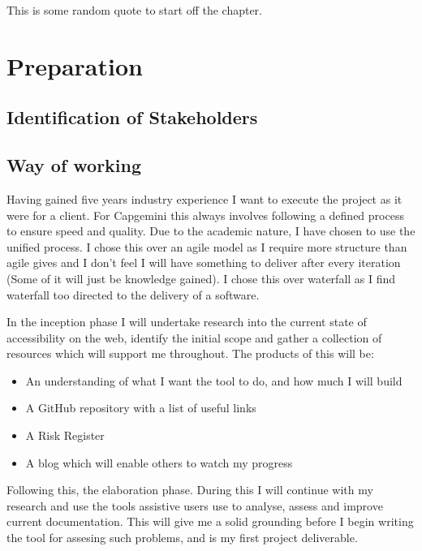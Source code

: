 \begin{savequote}[75mm]
This is some random quote to start off the chapter.
\end{savequote}

\chapter{Preparation}

\section{Identification of Stakeholders}

\section{Way of working}
Having gained five years industry experience I want to execute the project as it were for a client. For Capgemini this always involves
following a defined process to ensure speed and quality. Due to the academic nature, I have chosen to use the unified process. I chose this
over an agile model as I require more structure than agile gives and I don't feel I will have something to deliver after every iteration
(Some of it will just be knowledge gained). I chose this over waterfall as I find waterfall too directed to the delivery of a software.


In the inception phase I will undertake research into the current state of accessibility on the web, identify the initial scope and gather
a collection of resources which will support me throughout. The products of this will be:
\begin{itemize}
  \item An understanding of what I want the tool to do, and how much I will build
  \item A GitHub repository with a list of useful links
  \item A Risk Register
  \item A blog which will enable others to watch my progress
\end{itemize}

Following this, the elaboration phase. During this I will continue with my research and use the tools assistive users use to analyse,
assess and improve current documentation. This will give me a solid grounding before I begin writing the tool for assesing such problems,
 and is my first project deliverable.

